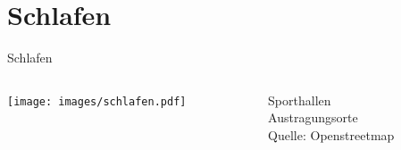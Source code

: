 \documentclass[compress,]{beamer}
\begin{document}
\section{Schlafen}
\begin{frame}{Schlafen}
  \begin{columns}[onlytextwidth]
    \begin{column}{0.8\textwidth}
      \texttt{[image: images/schlafen.pdf]}
    \end{column}
    \begin{column}{0.2\textwidth}
      {\color{red} Sporthallen} \\
      {\color{blue} Austragungsorte} \\
      Quelle: Openstreetmap
    \end{column}
  \end{columns}
\end{frame}
\end{document}
